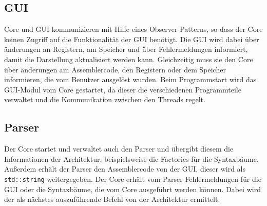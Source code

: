 \subsection{GUI}

Core und GUI kommunizieren mit Hilfe eines Observer-Patterns, so dass der Core keinen Zugriff auf die Funktionalität der GUI benötigt. Die GUI wird dabei über änderungen an Registern, am Speicher und über Fehlermeldungen informiert, damit die Darstellung aktualisiert werden kann. Gleichzeitig muss sie den Core über änderungen am Assemblercode, den Registern oder dem Speicher informieren, die vom Benutzer ausgelöst wurden. Beim Programmstart wird das GUI-Modul vom Core gestartet, da dieser die verschiedenen Programmteile verwaltet und die Kommunikation zwischen den Threads regelt.

\subsection{Parser}

Der Core startet und verwaltet auch den Parser und übergibt diesem die Informationen der Architektur, beispielsweise die Factories für die Syntaxbäume. Au{\ss}erdem erhält der Parser den Assemblercode von der GUI, dieser wird als \lstinline!std::string! weitergegeben. Der Core erhält vom Parser Fehlermeldungen für die GUI oder die Syntaxbäume, die vom Core ausgeführt werden können. Dabei wird der als nächstes auszuführende Befehl von der Architektur ermittelt.
